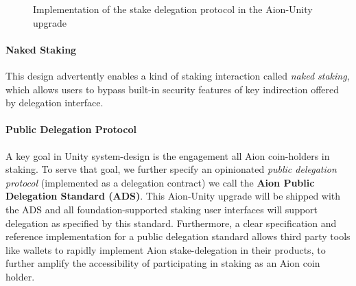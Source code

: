 \begin{figure}[ht]
\centering
{}
\caption{Implementation of the stake delegation protocol in the Aion-Unity upgrade}
\label{fig:delegation_scheme}
\end{figure}

\paragraph{Naked Staking}

This design advertently enables a kind of staking interaction called \textit{naked staking}, which allows users to bypass built-in security features of key indirection offered by delegation interface. 

\paragraph{Public Delegation Protocol}
A key goal in Unity system-design is the engagement all Aion coin-holders in staking. To serve that goal, we further specify an opinionated \textit{public delegation protocol} (implemented as a delegation contract) we call the \textbf{Aion Public Delegation Standard (ADS)}. This Aion-Unity upgrade will be shipped with the ADS and all foundation-supported staking user interfaces will support delegation as specified by this standard. Furthermore, a clear specification and reference implementation for a public delegation standard allows third party tools like wallets to rapidly implement Aion stake-delegation in their products, to further amplify the accessibility of participating in staking as an Aion coin holder. 

